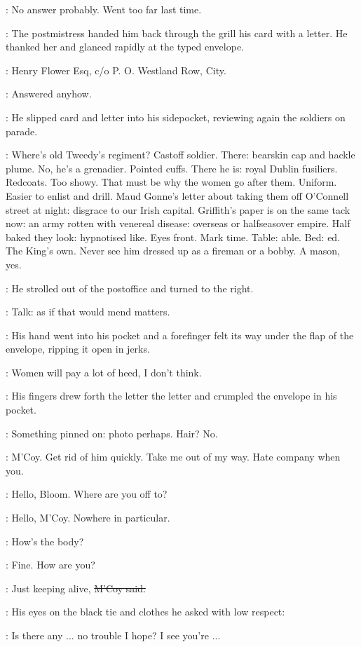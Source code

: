 \BloomInt:
No answer probably.
Went too far last time.

:
The postmistress handed him back through the grill
his card with a letter.
He thanked her and glanced rapidly at the typed envelope.

:
Henry Flower Esq,
c/o P. O. Westland Row,
City.

\BloomInt:
Answered anyhow.

:
He slipped card and letter into his sidepocket,
reviewing again the soldiers on parade.

\BloomInt:
Where's old Tweedy's regiment?
Castoff soldier.
There: bearskin cap and hackle plume.
No, he's a grenadier.
Pointed cuffs.
There he is: royal Dublin fusiliers.
Redcoats.
Too showy.
That must be why the women go after them.
Uniform.
Easier to enlist and drill.
Maud Gonne's letter about taking them off O'Connell street at night:
disgrace to our Irish capital.
Griffith's paper is on the same tack now:
an army rotten with venereal disease:
overseas or halfseasover empire.
Half baked they look:
hypnotised like.
Eyes front.
Mark time.
Table: able.
Bed: ed.
The King's own.
Never see him dressed up as a fireman or a bobby.
A mason, yes.

:
He strolled out of the postoffice and turned to the right.

\BloomInt:
Talk:
as if that would mend matters.

:
His hand went into his pocket
and a forefinger felt its way under the flap of the envelope,
ripping it open in jerks.

\BloomInt:
Women will pay a lot of heed, I don't think.

:
His fingers drew forth the letter
the letter and crumpled the envelope in his pocket.

\BloomInt:
Something pinned on:
photo perhaps.
Hair?
No.

\BloomInt:
M'Coy.
Get rid of him quickly.
Take me out of my way.
Hate company when you.

\mccoy:
Hello, Bloom.
Where are you off to?

\Bloom:
Hello, M'Coy.
Nowhere in particular.

\mccoy:
How's the body?

\Bloom:
Fine.
How are you?

\mccoy:
Just keeping alive,
\sout{M'Coy said.}

:
His eyes on the black tie and clothes
he asked with low respect:

\mccoy:
Is there any ... no trouble I hope?
I see you're ...

